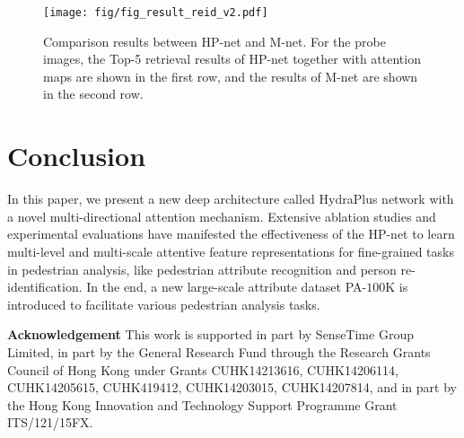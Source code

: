 \documentclass[10pt,twocolumn,letterpaper]{article}
\begin{document}
\begin{figure}[t]
\small
\centering
\texttt{[image: fig/fig\_result\_reid\_v2.pdf]}
\caption{
Comparison results between HP-net and M-net. For the probe images, the Top-5 retrieval results of HP-net together with attention maps are shown in the first row, and the results of M-net are shown in the second row.
}
\label{fig:result_reid}
\end{figure}


\section{Conclusion}
\label{sec:conclusion}
\vspace{-0.1cm}
In this paper, we present a new deep architecture called HydraPlus network with a novel multi-directional attention mechanism.
Extensive ablation studies and experimental evaluations have manifested the effectiveness of the HP-net to learn multi-level and multi-scale attentive feature representations for fine-grained tasks in pedestrian analysis, like pedestrian attribute recognition and person re-identification.
In the end, a new large-scale attribute dataset PA-$100$K is introduced to facilitate various pedestrian analysis tasks.

\vspace{+5pt}
\noindent\textbf{Acknowledgement} This work is supported in part by SenseTime Group Limited, in part by the General Research Fund through the Research Grants Council of Hong Kong under Grants CUHK14213616, CUHK14206114, CUHK14205615, CUHK419412, CUHK14203015, CUHK14207814, and in part by the Hong Kong Innovation and Technology Support Programme Grant ITS/121/15FX.





{\small


}
\end{document}
